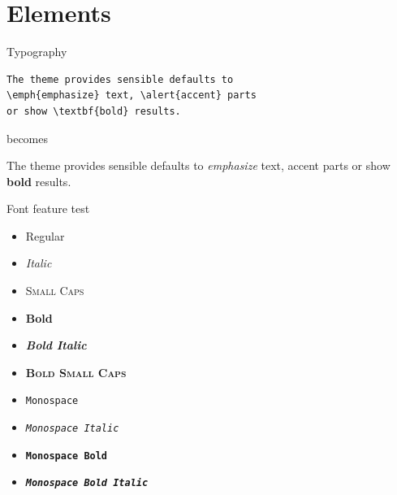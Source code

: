 \documentclass[8pt, aspectratio=169]{beamer}
\begin{document}
\section{Elements}

\begin{frame}[fragile]{Typography}
      \begin{verbatim}The theme provides sensible defaults to
\emph{emphasize} text, \alert{accent} parts
or show \textbf{bold} results.\end{verbatim}

  \begin{center}becomes\end{center}

  The theme provides sensible defaults to \emph{emphasize} text,
  \alert{accent} parts or show \textbf{bold} results.
\end{frame}

\begin{frame}{Font feature test}
  \begin{itemize}
    \item Regular
    \item \textit{Italic}
    \item \textsc{Small Caps}
    \item \textbf{Bold}
    \item \textbf{\textit{Bold Italic}}
    \item \textbf{\textsc{Bold Small Caps}}
    \item \texttt{Monospace}
    \item \texttt{\textit{Monospace Italic}}
    \item \texttt{\textbf{Monospace Bold}}
    \item \texttt{\textbf{\textit{Monospace Bold Italic}}}
  \end{itemize}
\end{frame}
\end{document}
